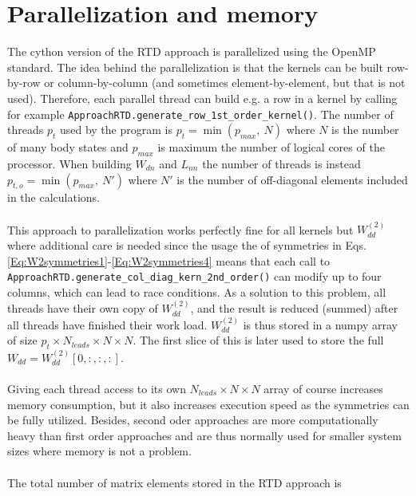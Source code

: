 \documentclass{article}
\begin{document}
\section{Parallelization and memory}

The cython version of the RTD approach is parallelized using the OpenMP standard. The idea behind the parallelization is that the kernels can be built row-by-row or column-by-column (and sometimes element-by-element, but that is not used). Therefore, each parallel thread can build e.g. a row in a kernel by calling for example \verb!ApproachRTD.generate_row_1st_order_kernel()!. The number of threads $p_t$ used by the program is $p_t=\min(p_{max},\ N)$ where $N$ is the number of many body states and $p_{max}$ is maximum the number of logical cores of the processor. When building $W_{dn}$ and $L_{nn}$ the number of threads is instead $p_{t,o}=\min(p_{max},\ N')$ where $N'$ is the number of off-diagonal elements included in the calculations. 
\\
\\
This approach to parallelization works perfectly fine for all kernels but $W_{dd}^{(2)}$ where additional care is needed since the usage the of symmetries in Eqs. \ref{Eq:W2symmetries1}-\ref{Eq:W2symmetries4} means that each call to \verb!ApproachRTD.generate_col_diag_kern_2nd_order()! can modify up to four columns, which can lead to race conditions. As a solution to this problem, all threads have their own copy of $W_{dd}^{(2)}$, and the result is reduced (summed) after all threads have finished their work load. $W_{dd}^{(2)}$ is thus stored in a numpy array of size $p_t \times N_{leads} \times N \times N$. The first slice of this is later used to store the full $W_{dd} = W_{dd}^{(2)}[0,:,:,:]$.
\\
\\
Giving each thread access to its own $N_{leads} \times N \times N$ array of course increases memory consumption, but it also increases execution speed as the symmetries can be fully utilized. Besides, second oder approaches are more computationally heavy than first order approaches and are thus normally used for smaller system sizes where memory is not a problem.
\\
\\
The total number of matrix elements stored in the RTD approach is
\end{document}
